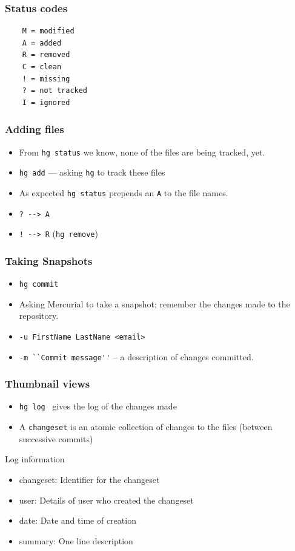\documentclass[14pt,compress]{beamer}
\newcommand{\typ}[1]{\lstinline{#1}}
\begin{document}
\begin{frame}[fragile]
  \frametitle{Status codes}
  \begin{lstlisting}
    M = modified                                               
    A = added                                                  
    R = removed                                                
    C = clean                                                  
    ! = missing 
    ? = not tracked                                            
    I = ignored                                                
  \end{lstlisting}
\end{frame}

\begin{frame}
  \frametitle{Adding files}
  \begin{itemize}
  \item From \typ{hg status} we know, none of the files are being
    tracked, yet. 
  \item \typ{hg add} --- asking \typ{hg} to track these files
  \item As expected \typ{hg status} prepends an \typ{A} to the file
  names.
  \item \typ{? --> A} 
  \item \typ{! --> R} (\typ{hg remove})
  \end{itemize}
\end{frame}

\begin{frame}
  \frametitle{Taking Snapshots}
  \begin{itemize}
  \item \typ{hg commit}
  \item Asking Mercurial to take a snapshot; remember the changes made
    to the repository. 
  \item \typ{-u FirstName LastName <email>}
  \item \typ{-m ``Commit message''} -- a description of changes committed. 
  \end{itemize}
\end{frame}

\begin{frame}
  \frametitle{Thumbnail views}
  \begin{itemize}
  \item \typ{hg log}~ gives the log of the changes made
  \item A \typ{changeset} is an atomic collection of changes to the
    files (between successive commits)
  \end{itemize}
  \begin{block}{Log information}
    \begin{itemize}
    \item \alert{changeset}: Identifier for the changeset
    \item \alert{user}: Details of user who created the changeset
    \item \alert{date}: Date and time of creation
    \item \alert{summary}: One line description
    \end{itemize}    
  \end{block}
\end{frame}
\end{document}
